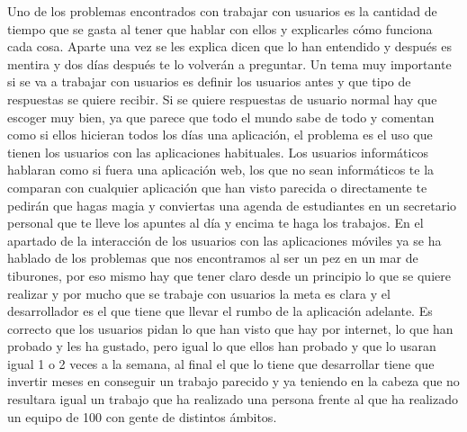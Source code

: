 Uno de los problemas encontrados con trabajar con usuarios es la cantidad de tiempo que se gasta al tener que hablar con ellos y explicarles cómo funciona cada cosa.
Aparte una vez se les explica dicen que lo han entendido y después es mentira y dos días después te lo volverán a preguntar.
Un tema muy importante si se va a trabajar con usuarios es definir los usuarios antes y que tipo de respuestas se quiere recibir. Si se quiere respuestas de usuario normal hay que escoger muy bien, ya que parece que todo el mundo sabe de todo y comentan como si ellos hicieran todos los días una aplicación, el problema es el uso que tienen los usuarios con las aplicaciones habituales.
Los usuarios informáticos hablaran como si fuera una aplicación web, los que no sean informáticos te la comparan con cualquier aplicación que han visto parecida o directamente te pedirán que hagas magia y conviertas una agenda de estudiantes en un secretario personal que te lleve los apuntes al día y encima te haga los trabajos.
En el apartado de la interacción de los usuarios con las aplicaciones móviles ya se ha hablado de los problemas que nos encontramos al ser un pez en un mar de tiburones, por eso mismo hay que tener claro desde un principio lo que se quiere realizar y por mucho que se trabaje con usuarios la meta es clara y el desarrollador es el que tiene que llevar el rumbo de la aplicación adelante. Es correcto que los usuarios pidan lo que han visto que hay por internet, lo que han probado y les ha gustado, pero igual lo que ellos han probado y que lo usaran igual 1 o 2 veces a la semana, al final el que lo tiene que desarrollar tiene que invertir meses en conseguir un trabajo parecido y ya teniendo en la cabeza que no resultara igual un trabajo que ha realizado una persona frente al que ha realizado un equipo de 100 con gente de distintos ámbitos.





















